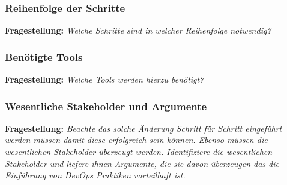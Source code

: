 

\subsubsection{Reihenfolge der Schritte}

\textbf{Fragestellung:} \textit{Welche Schritte sind in welcher Reihenfolge notwendig?}



\subsubsection{Benötigte Tools}

\textbf{Fragestellung:} \textit{Welche Tools werden hierzu benötigt?}

\subsubsection{Wesentliche Stakeholder und Argumente}

\textbf{Fragestellung:} \textit{Beachte das solche Änderung Schritt für Schritt eingeführt werden müssen damit diese
erfolgreich sein können. Ebenso müssen die wesentlichen Stakeholder überzeugt werden.
Identifiziere die wesentlichen Stakeholder und liefere ihnen Argumente, die sie davon
überzeugen das die Einführung von DevOps Praktiken vorteilhaft ist.}


